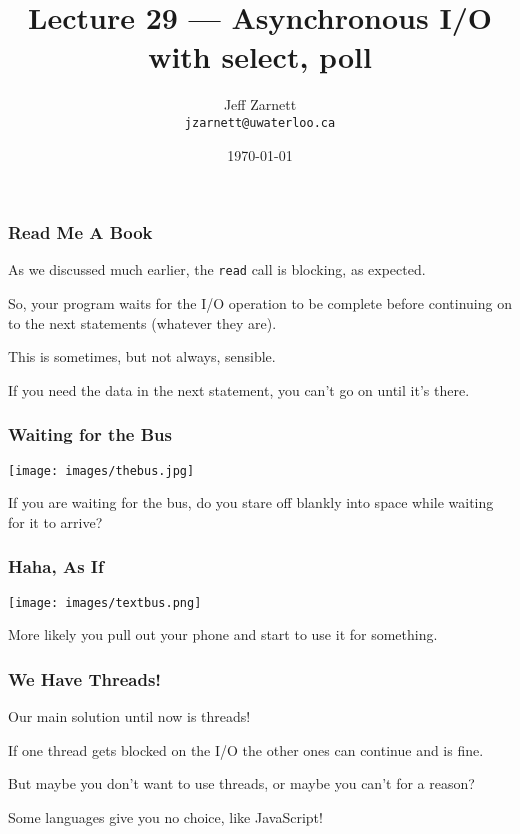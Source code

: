 

\title{Lecture 29 --- Asynchronous I/O with select, poll }

\author{Jeff Zarnett \\ \small \texttt{jzarnett@uwaterloo.ca}}
\date{\today}




\begin{frame}
	\titlepage

\end{frame}


\begin{frame}
	\frametitle{Read Me A Book}

	As we discussed much earlier, the \texttt{read} call is blocking, as expected.

	So, your program waits for the I/O operation to be complete before continuing on to the next statements (whatever they are).

	This is sometimes, but not always, sensible.

	If you need the data in the next statement, you can't go on until it's there.

\end{frame}


\begin{frame}
	\frametitle{Waiting for the Bus}

	\begin{center}
		\texttt{[image: images/thebus.jpg]}
	\end{center}

	If you are waiting for the bus, do you stare off blankly into space while waiting for it to arrive?

\end{frame}

\begin{frame}
	\frametitle{Haha, As If}

	\begin{center}
		\texttt{[image: images/textbus.png]}
	\end{center}

	More likely you pull out your phone and start to use it for something.

\end{frame}

\begin{frame}
	\frametitle{We Have Threads!}

	Our main solution until now is threads!

	If one thread gets blocked on the I/O the other ones can continue and is fine.

	But maybe you don't want to use threads, or maybe you can't for a reason?

	Some languages give you no choice, like JavaScript!

\end{frame}


